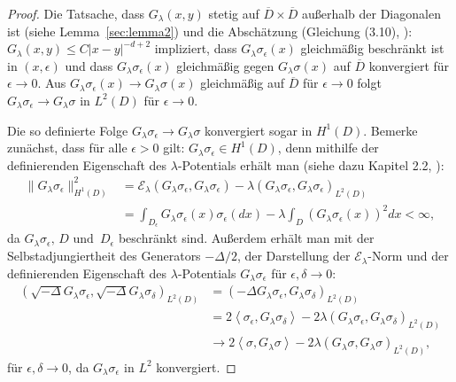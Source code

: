 \documentclass[10pt, a4paper, leqno, twoside, bibliography=totocnumbered, final]{scrartcl}
\theoremstyle{definition}
\theoremstyle{plain}%
\theoremstyle{remark}
\begin{document}
\begin{proof}
Die Tatsache, dass $ G_{\lambda} (x,y) $ stetig auf $ \overline{D} \times \overline{D} $ außerhalb der Diagonalen ist (siehe Lemma~\ref{sec:lemma2}) und die Abschätzung (Gleichung (3.10), \cite{Fukushima}): $ G_{\lambda} (x,y) \leq C | x - y |^{-d+2} $ impliziert, dass $ G_{\lambda} \sigma_{\epsilon} (x) $ gleichmäßig beschränkt ist in $ (x, \epsilon ) $ und dass $ G_{\lambda} \sigma_{\epsilon} (x) $ gleichmäßig gegen $ G_{\lambda} \sigma (x) $ auf $ \overline{D} $ konvergiert für $ \epsilon \to 0 $. Aus $ G_{\lambda} \sigma_{\epsilon} (x) \to G_{\lambda} \sigma (x) $ gleichmäßig auf $ \overline{D} $ für $ \epsilon \to 0 $ folgt $ G_{\lambda} \sigma_{\epsilon} \to G_{\lambda} \sigma  $ in $ L^2(D) $ für $ \epsilon \to 0 $.

Die so definierte Folge $ G_{\lambda} \sigma_{\epsilon} \to G_{\lambda} \sigma  $ konvergiert sogar in $ H^1(D) $. Bemerke zunächst, dass für alle $ \epsilon > 0 $ gilt: $ G_{\lambda} \sigma_{\epsilon} \in H^1(D) $, denn mithilfe der definierenden Eigenschaft des $ \lambda $-Potentials erhält man (siehe dazu Kapitel 2.2, \cite{Fukushima}):
\begin{align*}
\| G_{\lambda} \sigma_{\epsilon} \|^2_{H^1(D)} & = \mathcal{E}_{\lambda} \left(G_{\lambda} \sigma_{\epsilon}, G_{\lambda} \sigma_{\epsilon}\right) - \lambda \left( G_{\lambda} \sigma_{\epsilon}, G_{\lambda} \sigma_{\epsilon}\right)_{L^2(D)} \\
& = \int_{D_{\epsilon}} G_{\lambda} \sigma_{\epsilon} (x) \sigma_{\epsilon} (dx) - \lambda \int_D ( G_{\lambda} \sigma_{\epsilon} (x) )^2 dx < \infty,
\end{align*}
da $ G_{\lambda} \sigma_{\epsilon}, \, D \text{ und } \, D_{\epsilon} $ beschränkt sind. Außerdem erhält man mit der Selbstadjungiertheit des Generators $ - \Delta / 2 $, der Darstellung der $ \mathcal{E}_{\lambda} $-Norm und der definierenden Eigenschaft des $ \lambda $-Potentials $ G_{\lambda} \sigma_{\epsilon} $ für $ \epsilon , \delta \to 0 $:
\begin{align*}
\left(\sqrt{- \Delta} G_{\lambda} \sigma_{\epsilon}, \sqrt{- \Delta} G_{\lambda} \sigma_{\delta}\right)_{L^2(D)} & = \left(- \Delta G_{\lambda} \sigma_{\epsilon}, G_{\lambda} \sigma_{\delta}\right)_{L^2(D)} \\
& = 2 \left\langle \sigma_{\epsilon} , G_{\lambda} \sigma_{\delta} \right\rangle - 2 \lambda \left( G_{\lambda} \sigma_{\epsilon}, G_{\lambda} \sigma_{\delta}\right)_{L^2(D)} \\
& \to 2 \left\langle \sigma , G_{\lambda} \sigma \right\rangle - 2 \lambda \left( G_{\lambda} \sigma, G_{\lambda} \sigma\right)_{L^2(D)},
\end{align*}
für $ \epsilon, \delta \to 0 $, da $  G_{\lambda} \sigma_{\epsilon} $ in $ L^2 $ konvergiert.


\end{proof}
\end{document}
